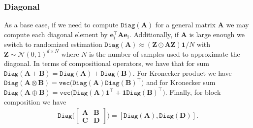 \documentclass{article}
\newcommand{\mbf}[1]{{\boldsymbol{\mathbf{#1}}}}
\renewcommand{\bm}{\mbf}
\begin{document}
\subsubsection{Diagonal}
As a base case, if we need to compute $\texttt{Diag}\left(\bm{A}\right)$ for a general matrix $\bm{A}$
we may compute each diagonal element by $\bm{e}_{i}^{\intercal}\bm{A} \bm{e}_{i}$.
Additionally, if $\bm{A}$ is large enough we switch to randomized estimation
$\texttt{Diag}(\bm A) \approx( \bm{Z} \odot \bm{A} \bm{Z})\mathbf{1}/N$ with $\bm{Z} \sim \mathcal{N}(0,1)^{d\times N}$
where $N$ is the number of samples used to approximate the diagonal.
In terms of compositional operators, we have that for sum
$\texttt{Diag}\left(\bm{A} + \bm{B}\right) = \texttt{Diag}\left(\bm{A}\right) + \texttt{Diag}\left(\bm{B}\right)$.
For Kronecker product we have
$\texttt{Diag}(\bm{A} \otimes \bm{B}) = \texttt{vec}\big(\texttt{Diag}(\bm{A})\texttt{Diag}(\bm{B})^{\intercal}\big)$
and for Kronecker sum
$\texttt{Diag}(\bm{A} \oplus \bm{B}) = \texttt{vec}\big(\texttt{Diag}\left(\bm{A}\right)\mathbf{1}^\intercal + \mathbf{1}\texttt{Diag}\left(\bm{B}\right)^\intercal\big)$.
Finally, for block composition we have
\begin{equation*}
    \begin{split}
      \texttt{Diag}\bigg({\begin{bmatrix} \bm{A} & \bm{B} \\ \bm{C} & \bm{D} \end{bmatrix}}\bigg)
        =
        [\texttt{Diag}(\bm{A}),\texttt{Diag}(\bm{D})]
        .
    \end{split}
\end{equation*}
\end{document}
